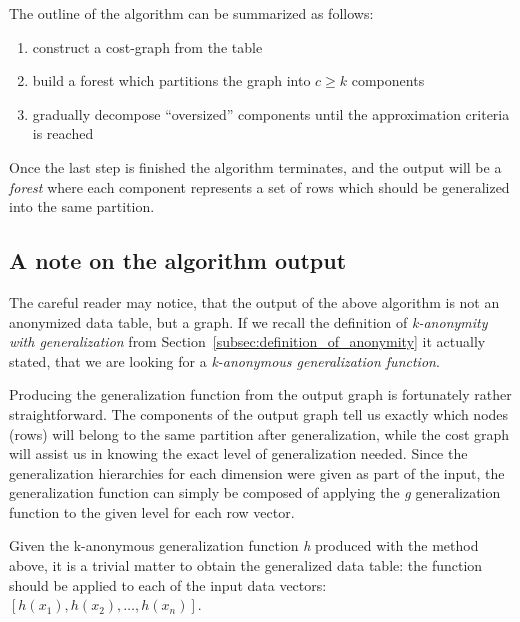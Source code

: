 The outline of the algorithm can be summarized as follows:

\begin{enumerate}
    \item construct a cost-graph from the table
    \item build a forest which partitions the graph into \(c \ge k\) components
    \item gradually decompose ``oversized'' components until the approximation criteria is reached
\end{enumerate}

Once the last step is finished the algorithm terminates, and the output will be a \textit{forest} where each component represents a set of rows which should be generalized into the same partition.

\subsection{A note on the algorithm output}\label{subsec:a-note-on-the-algorithm-output}

The careful reader may notice, that the output of the above algorithm is not an anonymized data table, but a graph.
If we recall the definition of \textit{k-anonymity with generalization} from Section~\ref{subsec:definition_of_anonymity} it actually stated, that we are looking for a \textit{k-anonymous generalization function}.

Producing the generalization function from the output graph is fortunately rather straightforward.
The components of the output graph tell us exactly which nodes (rows) will belong to the same partition after generalization, while the cost graph will assist us in knowing the exact level of generalization needed.
Since the generalization hierarchies for each dimension were given as part of the input, the generalization function can simply be composed of applying the \textit{g} generalization function to the given level for each row vector.

Given the k-anonymous generalization function \textit{h} produced with the method above, it is a trivial matter to obtain the generalized data table: the function should be applied to each of the input data vectors: \([h(x_1), h(x_2), \dots, h(x_n)]\).